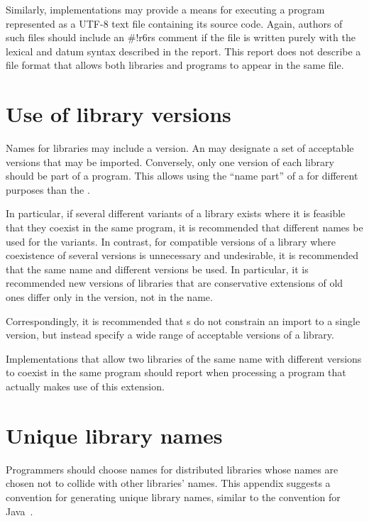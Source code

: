 \documentclass[twoside,twocolumn]{algol60}
\begin{document}
Similarly, implementations may provide a means for executing a program
represented as a UTF-8 text file containing its source code.  Again,
authors of such files should include an {\cf\#!r6rs}
comment if the file is written purely with the lexical and datum syntax
described in the report.  This report does not describe a file format
that allows both libraries and programs to appear in the same file.

\chapter{Use of library versions}

Names for libraries may include a version.  An  may
designate a set of acceptable versions that may be imported.
Conversely, only one version of each library should be part of a
program.  This allows using the ``name part'' of a  for different purposes than the . 

In particular, if several different variants of a library exists where
it is feasible that they coexist in the same program, it is
recommended that different names be used for the variants.  In
contrast, for compatible versions of a library where coexistence of
several versions is unnecessary and undesirable, it is recommended
that the same name and different versions be used.  In particular, it
is recommended new versions of libraries that are conservative
extensions of old ones differ only in the version, not in the name.

Correspondingly, it is recommended that s do not
constrain an import to a single version, but instead specify a wide
range of acceptable versions of a library.

Implementations that allow two libraries of the same name with
different versions to coexist in the same program should
report when processing a program that actually makes use of this
extension.

\chapter{Unique library names}
\label{librarynamesappendix}

Programmers should choose names for distributed libraries
whose names are chosen not to collide with other libraries' names.
This appendix suggests a convention for generating unique library
names, similar to the convention for Java~\cite{JLS3}.
\end{document}
